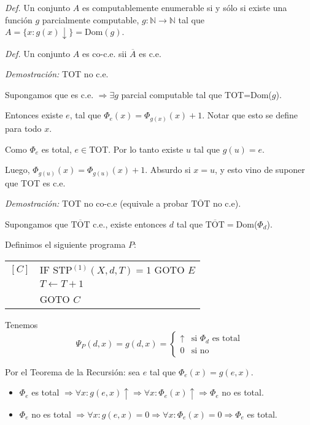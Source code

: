 \begin{questions}
\begin{solution}
 {\it Def. } Un conjunto $A$ es computablemente enumerable si y s\'olo si existe una funci\'on $g$ parcialmente computable, $g: \mathbb{N} \rightarrow \mathbb{N}$ tal que $A = \{x : g(x)\downarrow \} = \text{Dom}(g)$.

 {\it Def. } Un conjunto $A$ es co-c.e. sii $\overline{A}$ es c.e.
 
 {\it Demostraci\'on: } TOT no c.e.
 
 Supongamos que es c.e. $\Rightarrow \exists g$ parcial computable tal que TOT=Dom($g$).
 
 Entonces existe $e$, tal que $\Phi_e(x)=\Phi_{g(x)}(x)+1$. Notar que esto se define para todo $x$. 
 
 Como $\Phi_e$ es total, $e\in$TOT. Por lo tanto existe $u$ tal que $g(u)=e$. 
 
 Luego, $\Phi_{g(u)}(x)=\Phi_{g(u)}(x)+1$. Absurdo si $x=u$, y esto vino de suponer que TOT es c.e.
 
 {\it Demostraci\'on: } TOT no co-c.e (equivale a probar $\overline{\text{TOT}}$ no c.e).
 
 Supongamos que $\overline{\text{TOT}}$ c.e., existe entonces $d$ tal que $\overline{\text{TOT}}=$Dom($\Phi_d$). 
 
 Definimos el siguiente programa $P$: 
 
 \vspace{0.5cm}
  \begin{tabular}{rl}
    $[C]$ & IF STP$^{(1)}(X,d,T)=1$ GOTO $E$ \\
	  & $T\leftarrow T+1$\\
	  & GOTO $C$
  \end{tabular}
 \vspace{0.5cm}
 
 Tenemos
 \begin{equation*}
    \Psi_P(d,x) = g(d,x) = \left\{ \begin{matrix} 
      \uparrow & \text{si } \Phi_d \text{ es total} \\ 
      0 & \text{si no}
    \end{matrix} \right.
  \end{equation*}
  
 Por el Teorema de la Recursi\'on: sea $e$ tal que $\Phi_e(x)=g(e,x)$. 
 
 \begin{itemize}
  \item $\Phi_e$ es total $\Rightarrow\forall x: g(e,x)\uparrow\Rightarrow\forall x:\Phi_e(x)\uparrow\Rightarrow \Phi_e$ no es total.
  \item $\Phi_e$ no es total $\Rightarrow\forall x: g(e,x)=0 \Rightarrow\forall x: \Phi_e(x)=0\Rightarrow \Phi_e$ es total. 
 \end{itemize}


\end{solution}
\end{questions}
